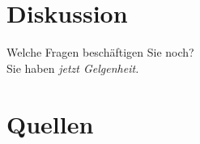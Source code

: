 \documentclass[aspectratio=169, xcolor=dvipsnames]{beamer}
\begin{document}
\section{Diskussion}
\begin{frame}{\secname}
\end{frame}

\begin{frame}[plain]
    \begin{center}
        \Huge{Welche Fragen beschäftigen Sie noch?}\\
        \Large{Sie haben \em{jetzt} Gelgenheit.}
    \end{center}
\end{frame}

\section{Quellen}
\begin{frame}[allowframebreaks]{\secname}
    \nocite{*}
    \printbibliography
\end{frame}
\end{document}
